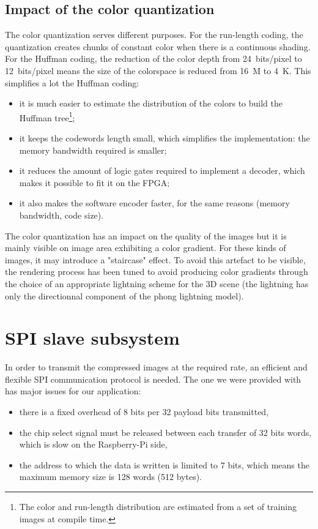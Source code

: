 \documentclass[english, DIV=13]{scrartcl}
\begin{document}
\subsection{Impact of the color quantization}

The color quantization serves different purposes. For the run-length coding,
the quantization creates chunks of constant color when there is a
continuous shading. For the Huffman
coding, the reduction of the color depth from \SI{24}{bits/pixel} to
\SI{12}{bits/pixel} means the size of the colorspace is reduced from
\SI{16}{M} to \SI{4}{K}. This simplifies a lot the Huffman coding:
\begin{itemize}
    \item it is much easier to estimate the distribution of the colors
    to build the Huffman tree\footnote{The color and run-length distribution are
    estimated from a set of training images at compile time.};
    \item it keeps the codewords length small, which simplifies the implementation:
    the memory bandwidth required is smaller;
    \item it reduces the amount of logic gates required to implement a decoder,
    which makes it possible to fit it on the FPGA;
    \item it also makes the software encoder faster, for the same reasons
    (memory bandwidth, code size).
\end{itemize}

The color quantization has an impact on the quality of the images
but it is mainly visible on image area exhibiting a color gradient.
For these kinds of images,
it may introduce a "staircase" effect. To avoid this artefact to be visible,
the rendering process has been tuned to avoid producing color gradients
through the choice of an appropriate lightning scheme for the 3D scene (the lightning
has only the directionnal component of the phong lightning model).

\section{SPI slave subsystem}
\label{sec:spi}

In order to transmit the compressed images at the required rate, an efficient and
flexible SPI communication protocol is needed.
The one we were provided with has major issues for our application:
\begin{itemize}
    \item there is a fixed overhead of 8 bits per 32 payload bits transmitted,
    \item the chip select signal must be released between each transfer of 32 bits
        words, which is slow on the Raspberry-Pi side,
    \item the address to which the data is written is limited to 7 bits, which means
        the maximum memory size is 128 words (512 bytes).
\end{itemize}
\end{document}
